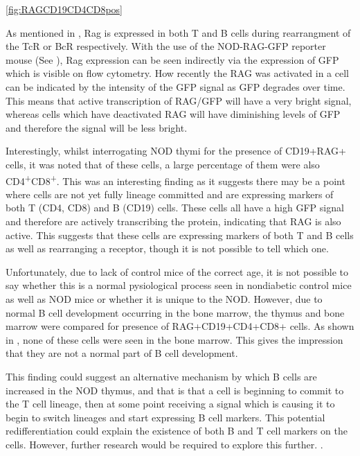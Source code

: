 \cref{fig:RAGCD19CD4CD8pos}

As mentioned in , Rag is expressed in both T and B cells during rearrangment of the TcR or BcR respectively.
With the use of the NOD-RAG-GFP reporter mouse (See ), Rag expression can be seen indirectly via the expression of GFP which is visible on flow cytometry.
How recently the RAG was activated in a cell can be indicated by the intensity of the GFP signal as GFP degrades over time.
This means that active transcription of RAG/GFP will have a very bright signal, whereas cells which have deactivated RAG will have diminishing levels of GFP and therefore the signal will be less bright.

Interestingly, whilst interrogating NOD thymi for the presence of CD19+RAG+ cells, it was noted that of these cells, a large percentage of them were also CD4\textsuperscript{+}CD8\textsuperscript{+}.
This was an interesting finding as it suggests there may be a point where cells are not yet fully lineage committed and are expressing markers of both T (CD4, CD8) and B (CD19) cells.
These cells all have a high GFP signal and therefore are actively transcribing the protein, indicating that RAG is also active.
This suggests that these cells are expressing markers of both T and B cells as well as rearranging a receptor, though it is not possible to tell which one.

Unfortunately, due to lack of control mice of the correct age, it is not possible to say whether this is a normal pysiological process seen in nondiabetic control mice as well as NOD mice or whether it is unique to the NOD.
However, due to normal B cell development occurring in the bone marrow, the thymus and bone marrow were compared for presence of RAG+CD19+CD4+CD8+ cells.
As shown in , none of these cells were seen in the bone marrow. 
This gives the impression that they are not a normal part of B cell development.

This finding could suggest an alternative mechanism by which B cells are increased in the NOD thymus, and that is that a cell is beginning to commit to the T cell lineage, then at some point receiving a signal which is causing it to begin to switch lineages and start expressing B cell markers.
This potential redifferentiation could explain the existence of both B and T cell markers on the cells. 
However, further research would be required to explore this further. .

